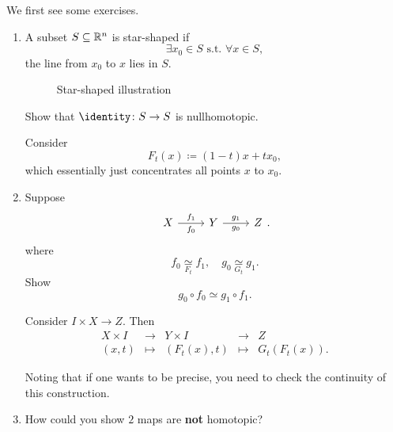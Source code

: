 \begin{exercise}
	We first see some exercises.
	\begin{enumerate}
		\item A subset \(S\subseteq \mathbb{\MakeUppercase{R}} ^n\) is star-shaped if
		      \[
			      \exists x_0\in S \text{ s.t. }\forall x\in S,
		      \]
		      the line from \(x_0\) to \(x\) lies in \(S\).
		      \begin{figure}[H]
			      \centering
			      \caption{Star-shaped illustration}
			      \label{fig:eg:star-shaped}
		      \end{figure}
		      Show that \(\identity\colon S\to S\) is nullhomotopic.

		      \begin{answer}
			      Consider
			      \[
				      F_{t}(x) \coloneqq (1 - t)x+tx_0,
			      \]
			      which essentially just concentrates all points \(x\) to \(x_0\).
		      \end{answer}
		\item Suppose
		      \[
			      \begin{tikzcd}
				      X \ar[r,"f_1", "f_0"'] & Y \ar[r,"g_1", "g_0"'] & Z
			      \end{tikzcd}.
		      \]
		      where
		      \[
			      f_0 \underset{F_{t}}{\simeq} f_1,\quad g_0\underset{G_{t}}{\simeq} g_1.
		      \]
		      Show
		      \[
			      g_0\circ f_0\simeq g_{1}\circ f_1.
		      \]
		      \begin{answer}
			      Consider \(I\times X\to Z\). Then
			      \[
				      \begin{array}{ccccc}
					      X \times I & \to     & Y \times I  & \to     & Z                \\
					      (x, t)     & \mapsto & (F_t(x), t) & \mapsto & G_{t}(F_{t}(x)).
				      \end{array}
			      \]
		      \end{answer}
		      \begin{remark}
			      Noting that if one wants to be precise, you need to check the continuity of this construction.
		      \end{remark}
		\item How could you show \(2\) maps are \textbf{not} homotopic?
		      \begin{answer}

		      \end{answer}
	\end{enumerate}
\end{exercise}